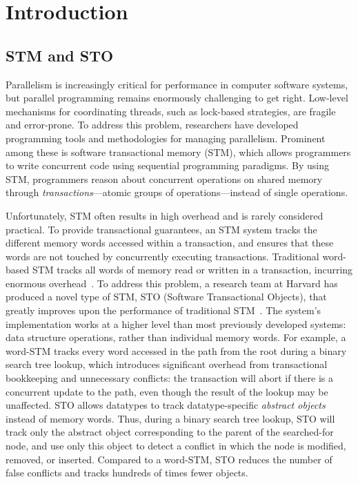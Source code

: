 \chapter{Introduction}
\section{STM and STO}
Parallelism is increasingly critical for performance in computer software systems, but parallel programming remains enormously challenging to get right. Low-level mechanisms for coordinating threads, such as lock-based strategies, are fragile and error-prone. To address this problem, researchers have developed programming tools and methodologies for managing parallelism. Prominent among these is software transactional memory (STM), which allows programmers to write concurrent code using sequential programming paradigms. By using STM, programmers reason about concurrent operations on shared memory through \emph{transactions}---atomic groups of operations---instead of single operations. 

Unfortunately, STM often results in high overhead and is rarely considered practical. To provide transactional guarantees, an STM system tracks the different memory words accessed within a transaction, and ensures that these words are not touched by concurrently executing transactions. Traditional word-based STM tracks all words of memory read or written in a transaction, incurring enormous overhead~\cite{cascaval}. To address this problem, a research team at Harvard has produced a novel type of STM, STO (Software Transactional Objects), that greatly improves upon the performance of traditional STM~\cite{sto}. The system's implementation works at a higher level than most previously developed systems: data structure operations, rather than individual memory words. For example, a word-STM tracks every word accessed in the path from the root during a binary search tree lookup, which introduces significant overhead from transactional bookkeeping and unnecessary conflicts: the transaction will abort if there is a concurrent update to the path, even though the result of the lookup may be unaffected. STO allows datatypes to track datatype-specific \emph{abstract objects} instead of memory words. Thus, during a binary search tree lookup, STO will track only the abstract object corresponding to the parent of the searched-for node, and use only this object to detect a conflict in which the node is modified, removed, or inserted. Compared to a word-STM, STO reduces the number of false conflicts and tracks hundreds of times fewer objects.


